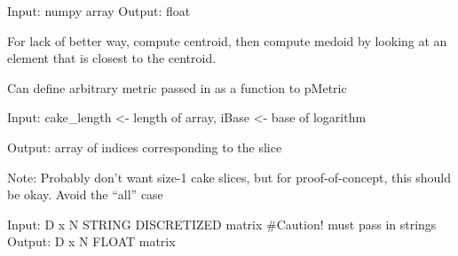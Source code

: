 \documentclass[letterpaper,10pt,english]{sphinxmanual}
\begin{document}

\begin{fulllineitems}
\label{index:halla.stats.get_medoid}
Input: numpy array 
Output: float

For lack of better way, compute centroid, then compute medoid 
by looking at an element that is closest to the centroid.

Can define arbitrary metric passed in as a function to pMetric

\end{fulllineitems}


\begin{fulllineitems}
\label{index:halla.stats.log_cut}
Input: cake\_length \textless{}- length of array, iBase \textless{}- base of logarithm

Output: array of indices corresponding to the slice

Note: Probably don't want size-1 cake slices, but for proof-of-concept, this should be okay. 
Avoid the ``all'' case

\end{fulllineitems}


\begin{fulllineitems}
\label{index:halla.stats.mca}
Input: D x N STRING DISCRETIZED matrix \#Caution! must pass in strings  
Output: D x N FLOAT matrix

\end{fulllineitems}

\end{document}
